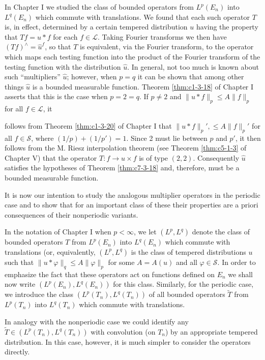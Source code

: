 In Chapter I we studied the class of bounded operators from $L^p(E_n)$ into $L^q(E_n)$ which commute with translations. We found that each such operator $T$ is, in effect, determined by a certain tempered distribution $u$ having the property that $Tf = u * f$ for each $f \in \mathcal{L}$. Taking Fourier transforms we then have $(Tf)^\wedge = \hat{u}^f$, so that $T$ is equivalent, via the Fourier transform, to the operator which maps each testing function into the product of the Fourier transform of the testing function with the distribution $\hat{u}$. In general, not too much is known about such ``multipliers'' $\hat{u}$; however, when $p = q$ it can be shown that among other things $\hat{u}$ is a bounded measurable function. Theorem \ref{thm:c1-3-18} of Chapter I asserts that this is the case when $p = 2 = q$. If $p \neq 2$ and $\|u * f\|_p \leq A \|f\|_p$ for all $f \in \mathcal{L}$, it

follows from Theorem \ref{thm:c1-3-20} of Chapter I that $\|u * f\|_p', \leq A \|f\|_p'$ for all $f \in \mathcal{S}$, where $(1/p) + (1/p') = 1$. Since 2 must lie between $p$ and $p'$, it then follows from the M. Riesz interpolation theorem (see Theorem \ref{thm:c5-1-3} of Chapter V) that the operator $T: f \to u \times f$ is of type $(2, 2)$. Consequently $\hat{u}$ satisfies the hypotheses of Theorem \ref{thm:c7-3-18} and, therefore, must be a bounded measurable function.

It is now our intention to study the analogous multiplier operators in the periodic case and to show that for an important class of these their properties are a priori consequences of their nonperiodic variants.

In the notation of Chapter I when $p < \infty$, we let $(L^p, L^q)$ denote the class of bounded operators $T$ from $L^p(E_n)$ into $L^q(E_n)$ which commute with translations (or, equivalently, $(L^p, L^q)$ is the class of tempered distributions $u$ such that $\|u * \varphi\|_q \leq A \|\varphi\|_p$ for some $A = A(u)$ and all $\varphi \in \mathcal{S}$. In order to emphasize the fact that these operators act on functions defined on $E_n$ we shall now write $(L^p(E_n), L^q(E_n))$ for this class. Similarly, for the periodic case, we introduce the class $(L^p(T_n), L^q(T_n))$ of all bounded operators $\tilde{T}$ from $L^p(T_n)$ into $L^q(T_n)$ which commute with translations.

In analogy with the nonperiodic case we could identify any $\tilde{T} \in (L^p(T_n), L^q(T_n))$ with convolution (on $T_n$) by an appropriate tempered distribution. In this case, however, it is much simpler to consider the operators directly.

